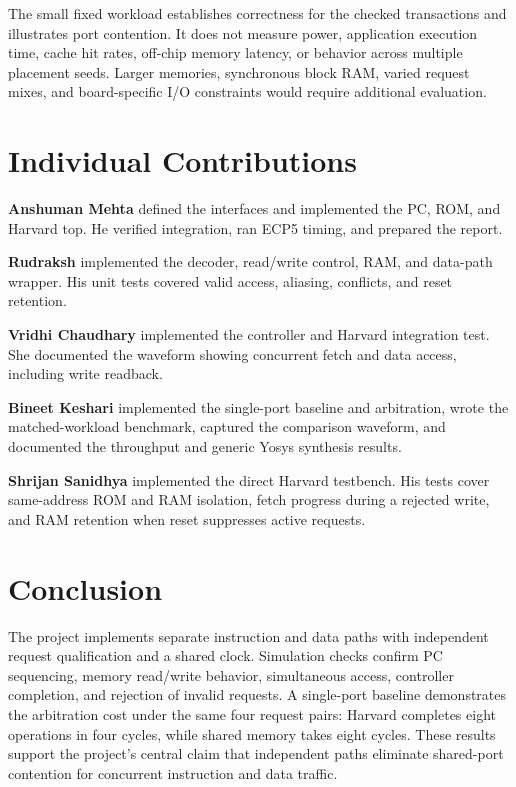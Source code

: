 \documentclass[conference]{IEEEtran}
\begin{document}
The small fixed workload establishes correctness for the checked transactions and illustrates port contention. It does not measure power, application execution time, cache hit rates, off-chip memory latency, or behavior across multiple placement seeds. Larger memories, synchronous block RAM, varied request mixes, and board-specific I/O constraints would require additional evaluation.

\section{Individual Contributions}
\textbf{Anshuman Mehta} defined the interfaces and implemented the PC, ROM, and Harvard top. He verified integration, ran ECP5 timing, and prepared the report.

\textbf{Rudraksh} implemented the decoder, read/write control, RAM, and data-path wrapper. His unit tests covered valid access, aliasing, conflicts, and reset retention.

\begin{samepage}
\textbf{Vridhi Chaudhary} implemented the controller and Harvard integration test. She documented the waveform showing concurrent fetch and data access, including write readback.\par
\end{samepage}

\textbf{Bineet Keshari} implemented the single-port baseline and arbitration, wrote the matched-workload benchmark, captured the comparison waveform, and documented the throughput and generic Yosys synthesis results.

\textbf{Shrijan Sanidhya} implemented the direct Harvard testbench. His tests cover same-address ROM and RAM isolation, fetch progress during a rejected write, and RAM retention when reset suppresses active requests.

\section{Conclusion}
The project implements separate instruction and data paths with independent request qualification and a shared clock. Simulation checks confirm PC sequencing, memory read/write behavior, simultaneous access, controller completion, and rejection of invalid requests. A single-port baseline demonstrates the arbitration cost under the same four request pairs: Harvard completes eight operations in four cycles, while shared memory takes eight cycles. These results support the project's central claim that independent paths eliminate shared-port contention for concurrent instruction and data traffic.
\end{document}
